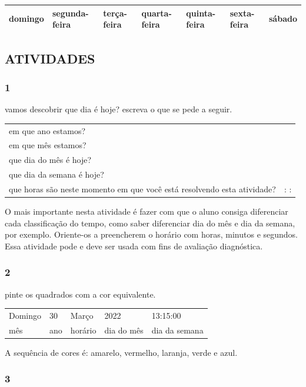 \begin{longtable}[]{@{}lllllll@{}}
\toprule
domingo & segunda-feira & terça-feira & quarta-feira & quinta-feira & sexta-feira &
sábado\tabularnewline
\bottomrule
\end{longtable}

\subsection{ATIVIDADES}\label{atividades-3}

\subsubsection{1}\label{section-39}

vamos descobrir que dia é hoje? escreva o que se pede a seguir.

\begin{longtable}[]{@{}ll@{}}
\toprule
em que ano estamos? &\tabularnewline
em que mês estamos? &\tabularnewline
que dia do mês é hoje? &\tabularnewline
que dia da semana é hoje? &\tabularnewline
que horas são neste momento em que você está resolvendo esta atividade? & : :\tabularnewline
\bottomrule
\end{longtable}

O mais importante nesta atividade é fazer com que o aluno
consiga diferenciar cada classificação do tempo, como saber diferenciar dia
do mês e dia da semana, por exemplo. Oriente-os a preencherem o horário
com horas, minutos e segundos. Essa atividade pode e deve ser usada com
fins de avaliação diagnóstica.

\subsubsection{2}\label{section-40}

pinte os quadrados com a cor equivalente.

\begin{longtable}[]{@{}lllll@{}}
\toprule
Domingo & 30 & Março & 2022 & 13:15:00\tabularnewline
mês & ano & horário & dia do mês & dia da semana\tabularnewline
\bottomrule
\end{longtable}

A sequência de cores é: amarelo, vermelho, laranja, verde e azul.

\subsubsection{3}\label{section-41}

